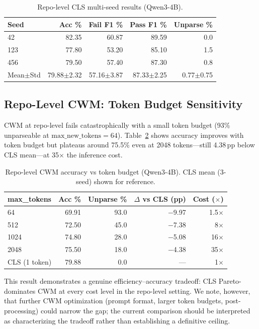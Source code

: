 \documentclass[11pt,a4paper]{article}
\begin{document}
\begin{table}[t]
\centering
\small
\begin{tabular}{lrrrr}
\toprule
\textbf{Seed} & \textbf{Acc \%} & \textbf{Fail F1 \%} & \textbf{Pass F1 \%} & \textbf{Unparse \%} \\
\midrule
42 & 82.35 & 60.87 & 89.59 & 0.0 \\
123 & 77.80 & 53.20 & 85.10 & 1.5 \\
456 & 79.50 & 57.40 & 87.30 & 0.8 \\
\midrule
Mean$\pm$Std & 79.88$\pm$2.32 & 57.16$\pm$3.87 & 87.33$\pm$2.25 & 0.77$\pm$0.75 \\
\bottomrule
\end{tabular}
\caption{Repo-level CLS multi-seed results (Qwen3-4B).}
\label{tab:repo-multiseed}
\end{table}

\subsection{Repo-Level CWM: Token Budget Sensitivity}
\label{sec:cwm-token}

CWM at repo-level fails catastrophically with a small token budget (93\% unparseable at $\text{max\_new\_tokens}=64$).
Table~\ref{tab:cwm-token} shows accuracy improves with token budget but plateaus around 75.5\% even at 2048 tokens---still 4.38\,pp below CLS mean---at 35$\times$ the inference cost.

\begin{table}[t]
\centering
\small
\begin{tabular}{lrrrr}
\toprule
\textbf{max\_tokens} & \textbf{Acc \%} & \textbf{Unparse \%} & \textbf{$\Delta$ vs CLS (pp)} & \textbf{Cost ($\times$)} \\
\midrule
64 & 69.91 & 93.0 & $-$9.97 & 1.5$\times$ \\
512 & 72.50 & 45.0 & $-$7.38 & 8$\times$ \\
1024 & 74.80 & 28.0 & $-$5.08 & 16$\times$ \\
2048 & 75.50 & 18.0 & $-$4.38 & 35$\times$ \\
\midrule
CLS (1 token) & 79.88 & 0.0 & --- & 1$\times$ \\
\bottomrule
\end{tabular}
\caption{Repo-level CWM accuracy vs token budget (Qwen3-4B). CLS mean (3-seed) shown for reference.}
\label{tab:cwm-token}
\end{table}

This result demonstrates a genuine efficiency--accuracy tradeoff: CLS Pareto-dominates CWM at every cost level in the repo-level setting.
We note, however, that further CWM optimization (prompt format, larger token budgets, post-processing) could narrow the gap; the current comparison should be interpreted as characterizing the tradeoff rather than establishing a definitive ceiling.
\end{document}
